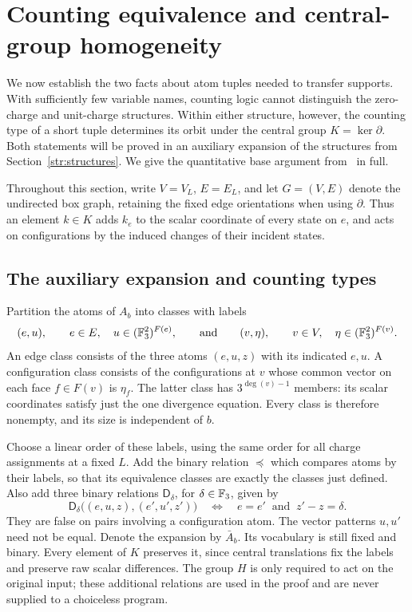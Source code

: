 \section{Counting equivalence and central-group homogeneity}
\label{sec:base-counting}
\label{base:counting}

We now establish the two facts about atom tuples needed to transfer
supports.  With sufficiently few variable names, counting logic cannot
distinguish the zero-charge and unit-charge structures.  Within either
structure, however, the counting type of a short tuple determines its
orbit under the central group $K=\ker\partial$.  Both statements will be
proved in an auxiliary expansion of the structures from
Section~\ref{str:structures}.  We give the quantitative base argument
from~\cite[Section~4, Propositions~11 and~13]{cptCompanion2026} in full.

Throughout this section, write $V=V_L$, $E=E_L$, and let $G=(V,E)$ denote
the undirected box graph, retaining the fixed edge orientations when
using $\partial$.  Thus an element $k\in K$ adds $k_e$ to the scalar
coordinate of every state on $e$, and acts on configurations by the
induced changes of their incident states.

\subsection{The auxiliary expansion and counting types}

Partition the atoms of $A_b$ into classes with labels
\[
 (e,u),\qquad
   e\in E,\quad u\in(\mathbb F_3^2)^{F(e)},
 \qquad\text{and}\qquad
 (v,\eta),\qquad
   v\in V,\quad \eta\in(\mathbb F_3^2)^{F(v)}.
\]
An edge class consists of the three atoms $(e,u,z)$ with its indicated
$e,u$.  A configuration class consists of the configurations at $v$
whose common vector on each face $f\in F(v)$ is $\eta_f$.  The latter
class has $3^{\deg(v)-1}$ members: its scalar coordinates satisfy just
the one divergence equation.  Every class is therefore nonempty, and
its size is independent of $b$.

Choose a linear order of these labels, using the same order for all
charge assignments at a fixed $L$.  Add the binary relation $\preceq$
which compares atoms by their labels, so that its equivalence classes
are exactly the classes just defined.  Also add three binary relations
$\mathsf D_\delta$, for $\delta\in\mathbb F_3$, given by
\[
 \mathsf D_\delta\bigl((e,u,z),(e',u',z')\bigr)
 \quad\Longleftrightarrow\quad
 e=e'\ \text{ and }\ z'-z=\delta.
\]
They are false on pairs involving a configuration atom.  The vector
patterns $u,u'$ need not be equal.  Denote the expansion by $\bar A_b$.
Its vocabulary is still fixed and binary.  Every element of $K$
preserves it, since central translations fix the labels and preserve
raw scalar differences.  The group $H$ is only required to act on the
original input; these additional relations are used in the proof and
are never supplied to a choiceless program.

